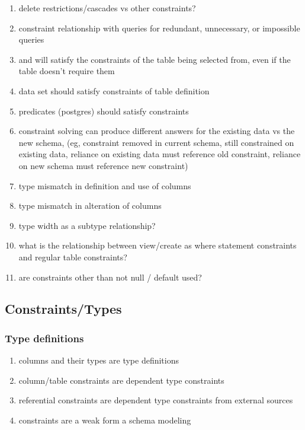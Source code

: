 \documentclass[12pt]{article}
\begin{document}
\begin{enumerate}
  \item delete restrictions/cascades vs other constraints?
  \item constraint relationship with queries for redundant, unnecessary, or impossible queries
  \item {} and  will satisfy the constraints of the table being selected from, even if the table doesn't require them
  \item {} data set should satisfy constraints of table definition
  \item {} predicates (postgres) should satisfy constraints
  \item constraint solving can produce different answers for the existing data vs the new schema, (eg, constraint removed in current schema, still constrained on existing data, reliance on existing data must reference old constraint, reliance on new schema must reference new constraint)
  \item type mismatch in definition and use of columns
  \item type mismatch in alteration of columns
  \item type width as a subtype relationship?
  \item what is the relationship between view/create as where statement constraints and regular table constraints?
  \item are constraints other than not null / default used?
\end{enumerate}

\subsection{Constraints/Types}

\subsubsection{Type definitions}

\begin{enumerate}
  \item columns and their types are type definitions
  \item column/table constraints are dependent type constraints
  \item referential constraints are dependent type constraints from external sources
  \item constraints are a weak form a schema modeling
\end{enumerate}
\end{document}
